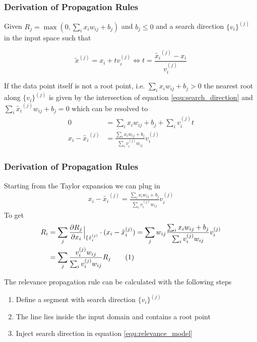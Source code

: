 \documentclass{beamer}
\newcommand\numberthis{\addtocounter{equation}{1}\tag{\theequation}}
\begin{document}
\begin{frame}
\frametitle{Derivation of Propagation Rules}
\vspace{0.3cm}
Given $R_j = \max(0, \sum_i x_iw_{ij} + b_j)$ and $b_j \leq 0$ and a search direction $\{v_i\}^{(j)}$ in the input space such that

\begin{equation}
\tilde{x}^{(j)} = x_i + t v_i ^{(j)} \Leftrightarrow t = \frac{\tilde{x_i}^{(j)} - x_i}{v_i^{(j)}}
\label{equ:search_direction}
\end{equation}

\vspace{0.2cm}
If the data point itself is not a root point, i.e. $\sum_i x_i w_{ij} + b_j>0$ the nearest root along $\{v_i\}^{(j)}$ is given by the intersection of equation \eqref{equ:search_direction} and $\sum_i\tilde{ x_i}^{(j)} w_{ij} + b_j=0$ which can be resolved to 
\vspace{-0.1cm}
\begin{align*}
0 &= \sum_i x_i w_{ij} + b_j + \sum_i v_i^{(j)} t \\
x_i - \tilde{x_i}^{(j)} & = \frac{\sum_i x_i w_{ij} + b_j}{\sum_i v_i^{(j)} w_{ij}} v_i^{(j)}
\end{align*}

\end{frame}

\begin{frame}
\frametitle{Derivation of Propagation Rules}
\vspace{0.4cm}
Starting from the Taylor expansion we can plug in 
\begin{align*}
x_i - \tilde{x_i}^{(j)} = \frac{\sum_i x_i w_{ij} + b_j}{\sum_i v_i^{(j)} w_{ij}} v_i^{(j)}
\end{align*}
\vspace{-0.2cm}
To get
\vspace{-0.2cm}
\begin{align*}
R_i & = \sum_j \frac{\partial R_j}{\partial x_i}\Big|_{\{\tilde{x}_i^{(j)}} \cdot (x_i - \tilde{x}_i^{(j)})= \sum_j w_{ij}\frac{\sum_i x_i w_{ij} + b_j}{\sum_i v_i^{(j)} w_{ij}} v_i^{(j)}\\
&= \sum_j\frac{v_i^{(j)} w_{ij}}{\sum_i v_i^{(j)} w_{ij}} R_j \numberthis \label{equ:relevance_model}
\end{align*}

The relevance propagation rule can be calculated with the following steps
\begin{enumerate}
	\item Define a segment with search direction $\{v_i\}^{(j)}$
	\item The line lies inside the input domain and contains a root point
	\item Inject search direction in equation \eqref{equ:relevance_model}
\end{enumerate}
\end{frame}
\end{document}

